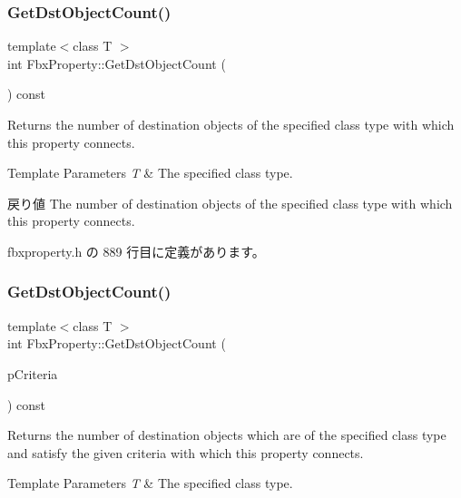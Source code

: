 \subsubsection{\texorpdfstring{Get\+Dst\+Object\+Count()}{GetDstObjectCount()}\hspace{0.1cm}{\footnotesize\ttfamily [3/4]}}
{\footnotesize\ttfamily template$<$class T $>$ \\
int Fbx\+Property\+::\+Get\+Dst\+Object\+Count (\begin{DoxyParamCaption}{ }\end{DoxyParamCaption}) const\hspace{0.3cm}{\ttfamily [inline]}}

Returns the number of destination objects of the specified class type with which this property connects. 
\begin{DoxyTemplParams}{Template Parameters}
{\em T} & The specified class type. \\
\hline
\end{DoxyTemplParams}
\begin{DoxyReturn}{戻り値}
The number of destination objects of the specified class type with which this property connects. 
\end{DoxyReturn}


 fbxproperty.\+h の 889 行目に定義があります。

\mbox{\label{class_fbx_property_a5ba90af060ad449844816a3234ad0750}} 
\subsubsection{\texorpdfstring{Get\+Dst\+Object\+Count()}{GetDstObjectCount()}\hspace{0.1cm}{\footnotesize\ttfamily [4/4]}}
{\footnotesize\ttfamily template$<$class T $>$ \\
int Fbx\+Property\+::\+Get\+Dst\+Object\+Count (\begin{DoxyParamCaption}\item[{const \hyperlink{class_fbx_criteria}{Fbx\+Criteria} \&}]{p\+Criteria }\end{DoxyParamCaption}) const\hspace{0.3cm}{\ttfamily [inline]}}

Returns the number of destination objects which are of the specified class type and satisfy the given criteria with which this property connects. 
\begin{DoxyTemplParams}{Template Parameters}
{\em T} & The specified class type. \\
\hline
\end{DoxyTemplParams}

